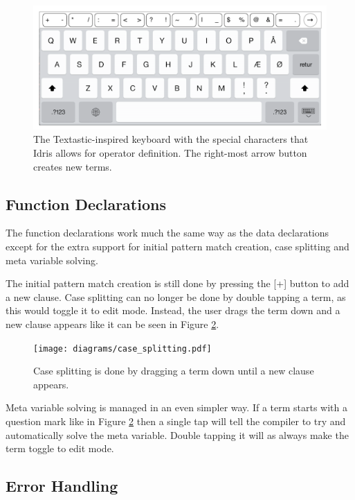 \begin{figure}
	\centering
		\includegraphics[width=115mm]{diagrams/design_keyboard.pdf}
	\caption{The Textastic-inspired keyboard with the special characters that
	Idris allows for operator definition. The right-most arrow button creates new
	terms.}
\label{fig:design_keyboard}
\end{figure}

\subsection{Function Declarations}
\label{subsec:new_design_function_dec}
The function declarations work much the same way as the data declarations
except for the extra support for initial pattern match creation, case splitting
and meta variable solving.

The initial pattern match creation is still done by pressing the [+] button to
add a new clause. Case splitting can no longer be done by double tapping a
term, as this would toggle it to edit mode. Instead, the user drags the term
down and a new clause appears like it can be seen in Figure
\ref{fig:case_splitting}.

\begin{figure}
	\centering
		\texttt{[image: diagrams/case\_splitting.pdf]}
	\caption{Case splitting is done by dragging a term down until a new clause
	appears.}
\label{fig:case_splitting}
\end{figure}

Meta variable solving is managed in an even simpler way. If a term starts with
a question mark like in Figure \ref{fig:case_splitting} then a single tap will
tell the compiler to try and automatically solve the meta variable. Double
tapping it will as always make the term toggle to edit mode.

\subsection{Error Handling}







